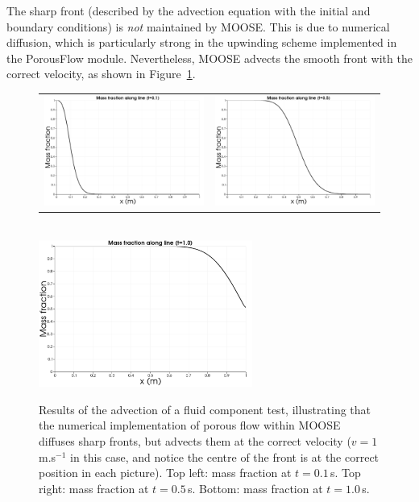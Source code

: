 \documentclass[]{scrreprt}
\begin{document}
The sharp front (described by the advection equation
with the initial and boundary conditions) is {\em not} maintained by
MOOSE.  This is due to numerical diffusion, which is particularly
strong in the upwinding scheme implemented in the PorousFlow module.
Nevertheless, MOOSE advects the smooth front with the correct
velocity, as shown in Figure~\ref{s09.fig}.

\begin{figure}[htb]
\begin{center}
\begin{tabular}{cc}
\includegraphics[width=7cm]{s09_0_1.pdf}  &
\includegraphics[width=7cm]{s09_0_5.pdf}
\end{tabular} \\
\includegraphics[width=7cm]{s09_1_0.pdf}
\caption{Results of the advection of a fluid component test,
  illustrating that the numerical implementation of porous flow within
  MOOSE diffuses sharp fronts, but advects them at the correct
  velocity ($v=1$\,m.s$^{-1}$ in this case, and notice the centre of
  the front is at the correct position in each picture).  Top left: mass fraction at
  $t=0.1$\,s.  Top right: mass fraction
  at $t=0.5$\,s.  Bottom: mass
  fraction at $t=1.0$\,s.}
\label{s09.fig}
\end{center}
\end{figure}
\end{document}
